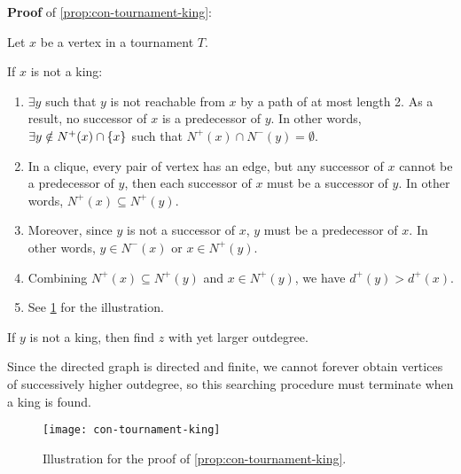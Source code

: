 \documentclass[../src/handouts/main.tex]{subfiles}
\begin{document}
\textbf{Proof} of \cref{prop:con-tournament-king}:
\begin{enumerate*}
  \item Let $x$ be a vertex in a tournament $T$. 
  \item If $x$ is not a king:
        \begin{enumerate}
          \item $\exists y$ such that $y$ is not reachable from $x$ by a path of at most length 2. As a result, no successor of $x$ is a predecessor of $y$. In other words, $\exists y \notin N^{+}(x) \cap \lbrace x\rbrace$ such that $N^{+}(x) \cap N^{-}(y) = \emptyset$.

          \item In a clique, every pair of vertex has an edge, but any successor of $x$ cannot be a predecessor of $y$, then each successor of $x$ must be a successor of $y$. In other words, $N^{+}(x) \subseteq N^{+}(y)$.

          \item Moreover, since $y$ is not a successor of $x$, $y$ must be a predecessor of $x$. In other words, $y \in N^{-}(x)$ or $x \in N^{+}(y)$.

          \item Combining $N^{+}(x) \subseteq N^{+}(y)$ and $x \in N^{+}(y)$, we have $d^{+}(y) > d^{+}(x)$.

          \item See \cref{fig:con-tournament-king} for the illustration.
        \end{enumerate}

  \item If $y$ is not a king, then find $z$ with yet larger outdegree.
  \item Since the directed graph is directed and finite, we cannot forever obtain vertices of successively higher outdegree, so this searching procedure must terminate when a king is found.
\end{enumerate*}

\begin{figure}[htbp]
  \centering
  \texttt{[image: con-tournament-king]}
  \caption{Illustration for the proof of \cref{prop:con-tournament-king}.}
  \label{fig:con-tournament-king}
\end{figure}
\end{document}
